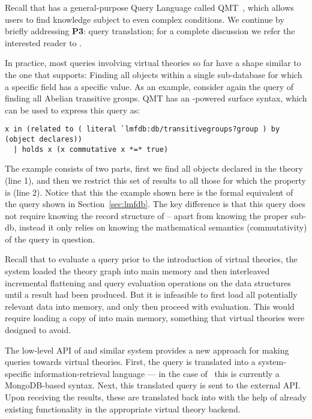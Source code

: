 Recall that \mmt has a general-purpose Query Language called QMT~\cite{Rabe:qlfml12}, which allows users to find knowledge subject to even complex conditions. 
We continue by briefly addressing \textbf{P3}: query translation; for a complete discussion we refer the interested reader to \cite{twiesing:msc17}. 

In practice, most queries involving virtual theories so far have a shape similar to the one that \lmfdb supports: 
Finding all objects within a single sub-database for which a specific field has a specific value. 
As an example, consider again the query of finding all Abelian transitive groups. 
QMT has an \mmt-powered surface syntax, which can be used to express this query as:
\begin{lstlisting}[language=qmt,basicstyle=\small\sf]
x in (related to ( literal `lmfdb:db/transitivegroups?group ) by (object declares)) 
  | holds x (x commutative x *=* true)
\end{lstlisting}

The example consists of two parts, first we find all objects declared in the  theory (line 1), and then we restrict this set of results to all those for which the  property is  (line 2). 
Notice that this the example shown here is the formal equivalent of the \lmfdb query shown in Section~\ref{sec:lmfdb}. 
The key difference is that this query does not require knowing the record structure of \lmfdb --
apart from knowing the proper sub-db, instead it only relies on knowing the mathematical
semantics (commutativity) of the query in question. 

Recall that to evaluate a query prior to the introduction of virtual theories, the \mmt system loaded the theory graph into main memory and then interleaved incremental flattening and query evaluation operations on the \mmt data structures until a result had been produced. 
But it is infeasible to first load all potentially relevant data into memory, and only then proceed with evaluation. 
This would require loading a copy of \lmfdb into main memory, something that virtual theories were designed to avoid. 

The low-level API of  \lmfdb and similar system provides a new approach for making queries towards virtual theories. 
First, the \mmt query is translated into a system-specific information-retrieval language --- in the case of \lmfdb\ this is currently a MongoDB-based syntax.
Next, this translated query is sent to the external API. 
Upon receiving the results, these are translated back into \ommt with the help of already existing functionality in the appropriate virtual theory backend.

